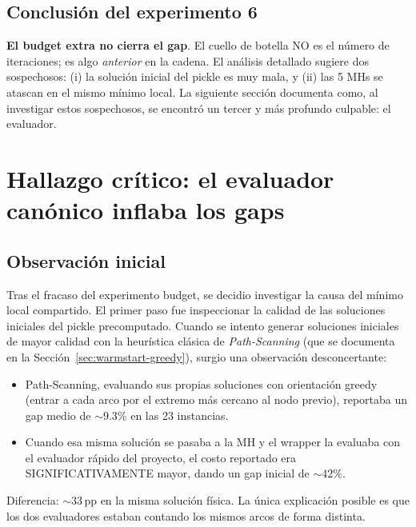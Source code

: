 \subsection{Conclusión del experimento 6}

\textbf{El budget extra no cierra el gap}. El cuello de botella NO es
el número de iteraciones; es algo \emph{anterior} en la cadena. El
análisis detallado sugiere dos sospechosos: (i) la solución inicial
del pickle es muy mala, y (ii) las 5 MHs se atascan en el mismo
mínimo local. La siguiente sección documenta como, al investigar
estos sospechosos, se encontró un tercer y más profundo culpable: el
evaluador.

\section{Hallazgo crítico: el evaluador canónico inflaba los gaps}
\label{sec:evaluador-canonico}

\subsection{Observación inicial}

Tras el fracaso del experimento budget, se decidio investigar la causa
del mínimo local compartido. El primer paso fue inspeccionar la
calidad de las soluciones iniciales del pickle precomputado. Cuando se
intento generar soluciones iniciales de mayor calidad con la heurística
clásica de \emph{Path-Scanning} (que se documenta en la
Sección~\ref{sec:warmstart-greedy}), surgio una observación
desconcertante:

\begin{itemize}
\item Path-Scanning, evaluando sus propias soluciones con orientación
  greedy (entrar a cada arco por el extremo más cercano al nodo
  previo), reportaba un gap medio de $\sim 9.3\%$ en las 23
  instancias.
\item Cuando esa misma solución se pasaba a la MH y el wrapper la
  evaluaba con el evaluador rápido del proyecto, el costo reportado
  era SIGNIFICATIVAMENTE mayor, dando un gap inicial de $\sim 42\%$.
\end{itemize}

Diferencia: $\sim 33$\,pp en la misma solución física. La única
explicación posible es que los dos evaluadores estaban contando los
mismos arcos de forma distinta.

